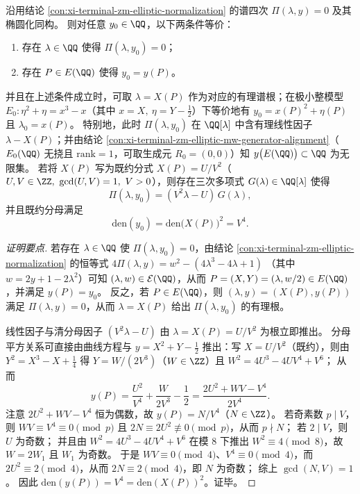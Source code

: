 \begin{conclusion}\label{con:xi-terminal-zm-pi-rational-root-iff-y-image}
沿用结论 \ref{con:xi-terminal-zm-elliptic-normalization} 的谱四次
\(
\Pi(\lambda,y)=0
\)
及其椭圆化同构。
则对任意 \(y_{0}\in\QQ\)，以下两条件等价：
\begin{enumerate}
  \item 存在 \(\lambda\in\QQ\) 使得 \(\Pi(\lambda,y_{0})=0\)；
  \item 存在 \(P\in E(\QQ)\) 使得 \(y_{0}=y(P)\)。
\end{enumerate}
并且在上述条件成立时，可取 \(\lambda=X(P)\) 作为对应的有理谱根；在极小整模型 \(E_0:\eta^2+\eta=x^3-x\)（其中 \(x=X,\ \eta=Y-\tfrac12\)）下等价地有 \(y_0=x(P)^2+\eta(P)\) 且 \(\lambda_0=x(P)\)。
特别地，此时 \(\Pi(\lambda,y_{0})\) 在 \(\QQ[\lambda]\) 中含有理线性因子 \(\lambda-X(P)\)；并由结论 \ref{con:xi-terminal-zm-elliptic-mw-generator-alignment}（\(E_0(\QQ)\) 无挠且 \(\mathrm{rank}=1\)，可取生成元 \(R_0=(0,0)\)）知 \(y\bigl(E(\QQ)\bigr)\subset\QQ\) 为无限集。
若将 \(X(P)\) 写为既约分式 \(X(P)=U/V^{2}\)（\(U,V\in\ZZ,\ \gcd(U,V)=1,\ V>0\)），则存在三次多项式 \(G(\lambda)\in\QQ[\lambda]\) 使得
\[
\Pi(\lambda,y_{0})=(V^{2}\lambda-U)\,G(\lambda),
\]
并且既约分母满足
\[
\mathrm{den}(y_{0})=\mathrm{den}\bigl(X(P)\bigr)^{2}=V^{4}.
\]
\end{conclusion}
\begin{proof}[证明要点]
若存在 \(\lambda\in\QQ\) 使 \(\Pi(\lambda,y_{0})=0\)，由结论 \ref{con:xi-terminal-zm-elliptic-normalization} 的恒等式
\(
4\Pi(\lambda,y)=w^{2}-(4\lambda^{3}-4\lambda+1)
\)
（其中 \(w=2y+1-2\lambda^{2}\)）可知 \((\lambda,w)\in\mathcal E(\QQ)\)，从而 \(P=(X,Y)=(\lambda,w/2)\in E(\QQ)\)，并满足 \(y(P)=y_{0}\)。
反之，若 \(P\in E(\QQ)\)，则 \((\lambda,y)=(X(P),y(P))\) 满足 \(\Pi(\lambda,y)=0\)，从而 \(\lambda=X(P)\) 给出 \(\Pi(\lambda,y_{0})\) 的有理根。
\par
线性因子与清分母因子 \((V^{2}\lambda-U)\) 由 \(\lambda=X(P)=U/V^{2}\) 为根立即推出。
分母平方关系可直接由曲线方程与 \(y=X^{2}+Y-\tfrac12\) 推出：写 \(X=U/V^{2}\)（既约），则由
\(
Y^{2}=X^{3}-X+\tfrac14
\)
得 \(Y=W/(2V^{3})\)（\(W\in\ZZ\)）且 \(W^{2}=4U^{3}-4UV^{4}+V^{6}\)；
从而
\[
y(P)=\frac{U^{2}}{V^{4}}+\frac{W}{2V^{3}}-\frac12=\frac{2U^{2}+WV-V^{4}}{2V^{4}}.
\]
注意 \(2U^{2}+WV-V^{4}\) 恒为偶数，故 \(y(P)=N/V^{4}\)（\(N\in\ZZ\)）。
若奇素数 \(p\mid V\)，则 \(WV\equiv V^{4}\equiv 0\pmod p\) 且 \(2N\equiv 2U^{2}\not\equiv 0\pmod p\)，从而 \(p\nmid N\)；
若 \(2\mid V\)，则 \(U\) 为奇数；
并且由 \(W^{2}=4U^{3}-4UV^{4}+V^{6}\) 在模 \(8\) 下推出 \(W^{2}\equiv 4\pmod 8\)，故 \(W=2W_{1}\) 且 \(W_{1}\) 为奇数。
于是 \(WV\equiv 0\pmod 4\)、\(V^{4}\equiv 0\pmod 4\)，而 \(2U^{2}\equiv 2\pmod 4\)，从而 \(2N\equiv 2\pmod 4\)，即 \(N\) 为奇数；
综上 \(\gcd(N,V)=1\)。
因此 \(\mathrm{den}(y(P))=V^{4}=\mathrm{den}(X(P))^{2}\)。证毕。
\end{proof}

